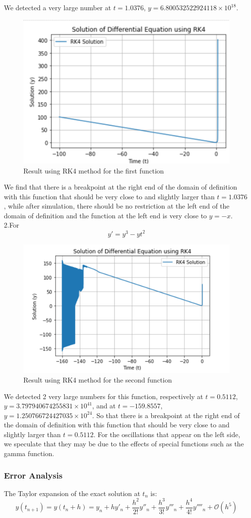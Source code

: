 \documentclass{article}
\begin{document}
We detected a very large number at \( t = 1.0376 \), \( y = 6.800532522924118 \times 10^{18} \). 
\begin{figure}[h!]
    \centering
    \includegraphics[width=0.5\linewidth]{pic学长/RK4_1.png}
    \caption{Result using RK4 method for the first function}
    \label{fig:example}
\end{figure}
We find that there is a breakpoint at the right end of the domain of definition with this function that should be very close to and slightly larger than \( t = 1.0376 \), while after simulation, there should be no restriction at the left end of the domain of definition and the function at the left end is very close to \( y = -x \).
2.For \[y' = y^3 - yt^2\]
\begin{figure}[h!]
    \centering
    \includegraphics[width=0.5\linewidth]{pic学长/RK4_2.png}
    \caption{Result using RK4 method for the second function}
    \label{fig:example}
\end{figure}
We detected 2 very large numbers for this function, respectively  
at \( t=0.5112 \), \( y=3.797940674255831 \times 10^{41} \), and at \( t=-159.8557 \), \( y=1.250766724427035 \times 10^{24} \). 
So that there is a breakpoint at the right end of the domain of definition with this function that should be very close to and slightly larger than \( t = 0.5112 \). 
For the oscillations that appear on the left side, we speculate that they may be due to the effects of special functions such as the gamma function.
\subsubsection{Error Analysis}
The Taylor expansion of the exact solution at \( t_n \) is:
\[
y(t_{n+1}) = y(t_n + h) = y_n + hy'_n + \frac{h^2}{2!} y''_n + \frac{h^3}{3!} y'''_n + \frac{h^4}{4!} y''''_n + \mathcal{O}(h^5)
\]
\end{document}
